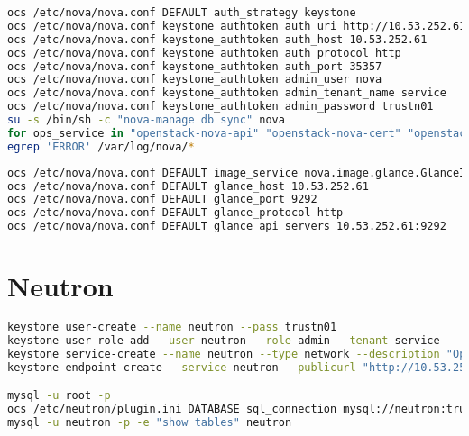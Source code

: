 \documentclass[11pt,letterpaper,oneside]{book}
\begin{document}
\begin{lstlisting}[caption={virctlpaw002},language=bash]
ocs /etc/nova/nova.conf DEFAULT auth_strategy keystone
ocs /etc/nova/nova.conf keystone_authtoken auth_uri http://10.53.252.61:5000
ocs /etc/nova/nova.conf keystone_authtoken auth_host 10.53.252.61
ocs /etc/nova/nova.conf keystone_authtoken auth_protocol http
ocs /etc/nova/nova.conf keystone_authtoken auth_port 35357
ocs /etc/nova/nova.conf keystone_authtoken admin_user nova
ocs /etc/nova/nova.conf keystone_authtoken admin_tenant_name service
ocs /etc/nova/nova.conf keystone_authtoken admin_password trustn01
su -s /bin/sh -c "nova-manage db sync" nova
for ops_service in "openstack-nova-api" "openstack-nova-cert" "openstack-nova-consoleauth" "openstack-nova-scheduler" "openstack-nova-conductor" "openstack-nova-novncproxy"; do systemctl enable $ops_service; systemctl start $ops_service; done
egrep 'ERROR' /var/log/nova/*


\end{lstlisting}

\begin{lstlisting}[caption={Nova Glance configuration},language=bash]
ocs /etc/nova/nova.conf DEFAULT image_service nova.image.glance.GlanceImageService
ocs /etc/nova/nova.conf DEFAULT glance_host 10.53.252.61
ocs /etc/nova/nova.conf DEFAULT glance_port 9292
ocs /etc/nova/nova.conf DEFAULT glance_protocol http
ocs /etc/nova/nova.conf DEFAULT glance_api_servers 10.53.252.61:9292
\end{lstlisting}


\chapter{Neutron}

\begin{lstlisting}[caption={Neutron virctlpaw001},language=bash]
keystone user-create --name neutron --pass trustn01
keystone user-role-add --user neutron --role admin --tenant service
keystone service-create --name neutron --type network --description "OpenStack Networking Service"
keystone endpoint-create --service neutron --publicurl "http://10.53.252.63:9696" --adminurl "http://10.53.252.63:9696" --internalurl "http://10.53.252.63:9696"

mysql -u root -p
ocs /etc/neutron/plugin.ini DATABASE sql_connection mysql://neutron:trustn01@10.53.252.61/neutron_ml2
mysql -u neutron -p -e "show tables" neutron
\end{lstlisting}
\end{document}
